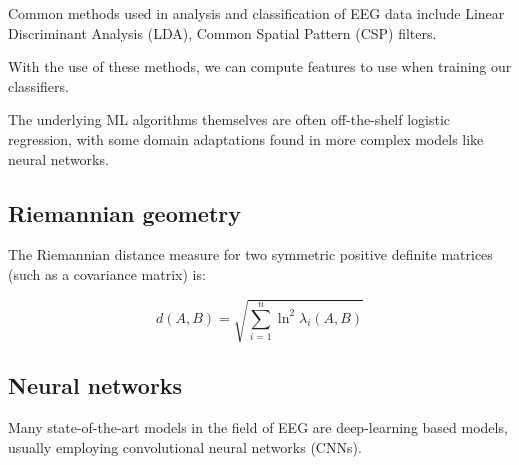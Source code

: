     Common methods used in analysis and classification of EEG data include Linear Discriminant Analysis (LDA), Common Spatial Pattern (CSP) filters.

    With the use of these methods, we can compute features to use when training our classifiers.

    The underlying ML algorithms themselves are often off-the-shelf logistic regression, with some domain adaptations found in more complex models like neural networks.


    \subsection{Riemannian geometry}\label{section:riemannian-theory}


        The Riemannian distance measure for two symmetric positive definite matrices (such as a covariance matrix) is:~\cite{grafarend_metric_2003}

        \[ d(A, B) = \sqrt{\sum_{i=1}^{n} \ln^2 \lambda_i (A, B) } \]

    \subsection{Neural networks}

        Many state-of-the-art models in the field of EEG are deep-learning based models, usually employing convolutional neural networks (CNNs).

